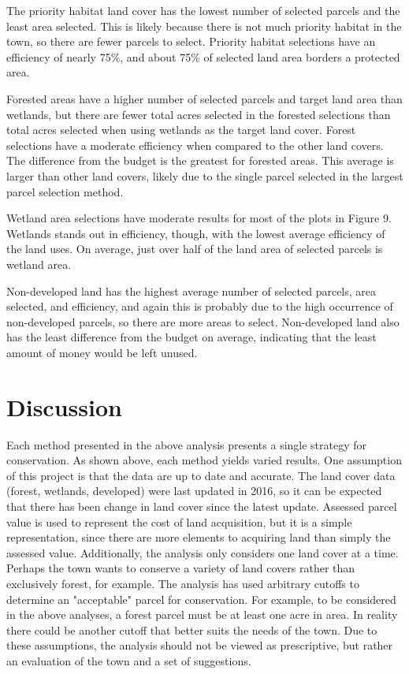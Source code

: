 \documentclass[12pt, stu, floatsintext,table]{apa7}
\begin{document}
The priority habitat land cover has the lowest number of selected parcels and the least area selected. This is likely because there is not much priority habitat in the town, so there are fewer parcels to select. Priority habitat selections have an efficiency of nearly 75\%, and about 75\% of selected land area borders a protected area. 

Forested areas have a higher number of selected parcels and target land area than wetlands, but there are fewer total acres selected in the forested selections than total acres selected when using wetlands as the target land cover. Forest selections have a moderate efficiency when compared to the other land covers. The difference from the budget is the greatest for forested areas. This average is larger than other land covers, likely due to the single parcel selected in the largest parcel selection method. 

Wetland area selections have moderate results for most of the plots in Figure 9. Wetlands stands out in efficiency, though, with the lowest average efficiency of the land uses. On average, just over half of the land area of selected parcels is wetland area. 

Non-developed land has the highest average number of selected parcels, area selected, and efficiency, and again this is probably due to the high occurrence of non-developed parcels, so there are more areas to select. Non-developed land also has the least difference from the budget on average, indicating that the least amount of money would be left unused. 
\section{Discussion}
Each method presented in the above analysis presents a single strategy for conservation. As shown above, each method yields varied results. One assumption of this project is that the data are up to date and accurate. The land cover data (forest, wetlands, developed) were last updated in 2016, so it can be expected that there has been change in land cover since the latest update. Assessed parcel value is used to represent the cost of land acquisition, but it is a simple representation, since there are more elements to acquiring land than simply the assessed value. Additionally, the analysis only considers one land cover at a time. Perhaps the town wants to conserve a variety of land covers rather than exclusively forest, for example. The analysis has used arbitrary cutoffs to determine an "acceptable" parcel for conservation. For example, to be considered in the above analyses, a forest parcel must be at least one acre in area. In reality there could be another cutoff that better suits the needs of the town. Due to these assumptions, the analysis should not be viewed as prescriptive, but rather an evaluation of the town and a set of suggestions.     
\end{document}
